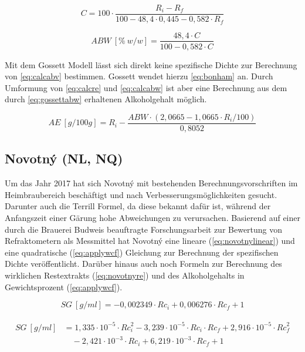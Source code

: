 \documentclass[a4paper,parskip=half]{scrartcl}
\newcommand{\bxi}{\mathit{R}_i}
\newcommand{\bxic}{\mathit{Rc}_i}
\newcommand{\bxf}{\mathit{R}_f}
\newcommand{\bxfc}{\mathit{Rc}_f}
\newcommand{\sg}{\mathit{SG}}
\newcommand{\abw}{\mathit{ABW}}
\newcommand{\aex}{\mathit{AE}}
\begin{document}
\begin{equation}
C = 100 \cdot \frac{\bxi - \bxf}{100 - 48,4 \cdot 0,445 - 0,582 \cdot \bxf}
\label{eq:gossett} 
\end{equation}

\begin{equation}
\abw\:[\%\:w/w] = \frac{48,4 \cdot C}{100 - 0,582 \cdot C}
\label{eq:gossettabw} 
\end{equation}

Mit dem Gossett Modell lässt sich direkt keine spezifische Dichte
zur Berechnung von \autoref{eq:calcabv} bestimmen. Gossett wendet
hierzu \autoref{eq:bonham} an. Durch Umformung von
\autoref{eq:calcre} und \autoref{eq:calcabw} ist aber eine Berechnung
aus dem durch \autoref{eq:gossettabw} erhaltenen Alkoholgehalt möglich.

\begin{equation}
\aex\:[g/100g] = \bxi - \frac{\abw \cdot (2,0665 - 1,0665 \cdot \bxi / 100)}{0,8052}
\label{eq:gossettcor}
\end{equation}

\subsection*{Novotný (NL, NQ)}

Um das Jahr 2017 hat sich Novotný mit bestehenden Berechnungsvorschriften
im Heimbraubereich beschäftigt und nach Verbesserungsmöglichkeiten
gesucht. Darunter auch die Terrill Formel, da diese bekannt dafür
ist, während der Anfangszeit einer Gärung hohe Abweichungen
zu verursachen. Basierend auf einer durch die Brauerei Budweis beauftragte Forschungsarbeit zur Bewertung von Refraktometern als Messmittel
hat Novotný eine lineare (\autoref{eq:novotnylinear}) und eine quadratische
(\autoref{eq:applywcf}) Gleichung zur Berechnung der spezifischen
Dichte veröffentlicht. Darüber hinaus auch noch Formeln zur
Berechnung des wirklichen Restextrakts (\autoref{eq:novotnyre}) und
des Alkoholgehalts in Gewichtsprozent (\autoref{eq:applywcf}). \autocite{Novotny2017a,Novotny2017,Savel2009}

\begin{equation} 
\sg\:[g/ml] = -0,002349 \cdot \bxic + 0,006276 \cdot \bxfc + 1
\label{eq:novotnylinear} 
\end{equation}

\begin{align}
\begin{split}
\sg\:[g/ml] &= 1,335 \cdot 10^{-5} \cdot \bxic^2 - 3,239 \cdot 10^{-5} \cdot \bxic \cdot \bxfc + 2,916 \cdot 10^{-5} \cdot \bxfc^2 \\
& \quad - 2,421 \cdot 10^{-3} \cdot \bxic + 6,219 \cdot 10^{-3} \cdot \bxfc + 1
\end{split} \label{eq:novotnyquadratic} 
\end{align}
\end{document}
